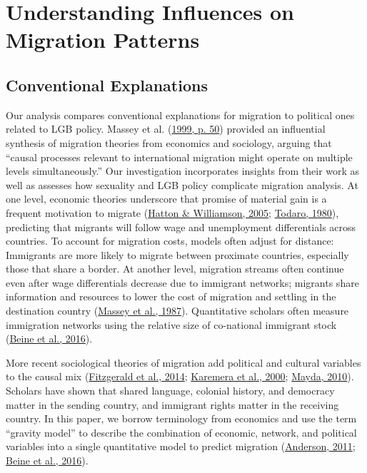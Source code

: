 \documentclass[
  11pt,
]{article}
\begin{document}
\hypertarget{understanding-influences-on-migration-patterns}{%
\section{Understanding Influences on Migration Patterns}\label{understanding-influences-on-migration-patterns}}

\hypertarget{conventional-explanations}{%
\subsection{Conventional Explanations}\label{conventional-explanations}}

Our analysis compares conventional explanations for migration to political ones related to LGB policy. Massey et al. (\protect\hyperlink{ref-massey_1999}{1999, p. 50}) provided an influential synthesis of migration theories from economics and sociology, arguing that ``causal processes relevant to international migration might operate on multiple levels simultaneously.'' Our investigation incorporates insights from their work as well as assesses how sexuality and LGB policy complicate migration analysis. At one level, economic theories underscore that promise of material gain is a frequent motivation to migrate (\protect\hyperlink{ref-hatton_2005a}{Hatton \& Williamson, 2005}; \protect\hyperlink{ref-todaro_1980}{Todaro, 1980}), predicting that migrants will follow wage and unemployment differentials across countries. To account for migration costs, models often adjust for distance: Immigrants are more likely to migrate between proximate countries, especially those that share a border. At another level, migration streams often continue even after wage differentials decrease due to immigrant networks; migrants share information and resources to lower the cost of migration and settling in the destination country (\protect\hyperlink{ref-massey_1987}{Massey et al., 1987}). Quantitative scholars often measure immigration networks using the relative size of co-national immigrant stock (\protect\hyperlink{ref-beine_2016}{Beine et al., 2016}).

More recent sociological theories of migration add political and cultural variables to the causal mix (\protect\hyperlink{ref-fitzgerald_2014}{Fitzgerald et al., 2014}; \protect\hyperlink{ref-karemera_2000}{Karemera et al., 2000}; \protect\hyperlink{ref-mayda_2010}{Mayda, 2010}). Scholars have shown that shared language, colonial history, and democracy matter in the sending country, and immigrant rights matter in the receiving country. In this paper, we borrow terminology from economics and use the term ``gravity model'' to describe the combination of economic, network, and political variables into a single quantitative model to predict migration (\protect\hyperlink{ref-anderson_2011}{Anderson, 2011}; \protect\hyperlink{ref-beine_2016}{Beine et al., 2016}).
\end{document}

